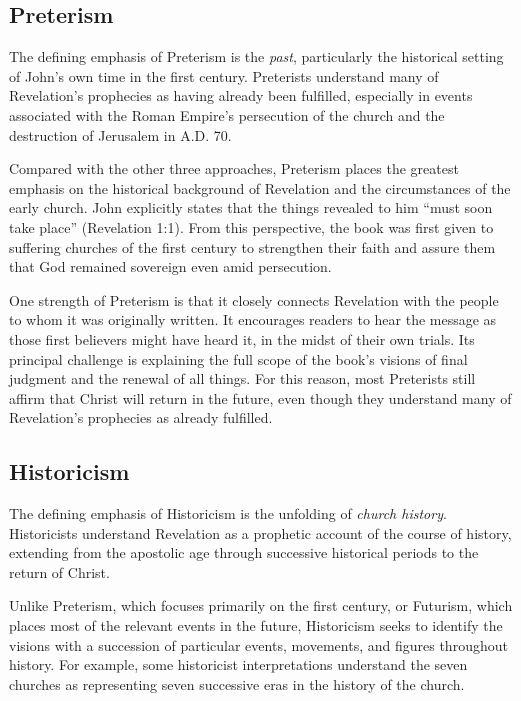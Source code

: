 \subsection*{Preterism}

The defining emphasis of Preterism is the \emph{past}, particularly the historical setting of John's own time in the first century. Preterists understand many of Revelation's prophecies as having already been fulfilled, especially in events associated with the Roman Empire's persecution of the church and the destruction of Jerusalem in A.D. 70.

Compared with the other three approaches, Preterism places the greatest emphasis on the historical background of Revelation and the circumstances of the early church. John explicitly states that the things revealed to him ``must soon take place'' (Revelation 1:1). From this perspective, the book was first given to suffering churches of the first century to strengthen their faith and assure them that God remained sovereign even amid persecution.

One strength of Preterism is that it closely connects Revelation with the people to whom it was originally written. It encourages readers to hear the message as those first believers might have heard it, in the midst of their own trials. Its principal challenge is explaining the full scope of the book's visions of final judgment and the renewal of all things. For this reason, most Preterists still affirm that Christ will return in the future, even though they understand many of Revelation's prophecies as already fulfilled.

\subsection*{Historicism}

The defining emphasis of Historicism is the unfolding of \emph{church history}. Historicists understand Revelation as a prophetic account of the course of history, extending from the apostolic age through successive historical periods to the return of Christ.

Unlike Preterism, which focuses primarily on the first century, or Futurism, which places most of the relevant events in the future, Historicism seeks to identify the visions with a succession of particular events, movements, and figures throughout history. For example, some historicist interpretations understand the seven churches as representing seven successive eras in the history of the church.


